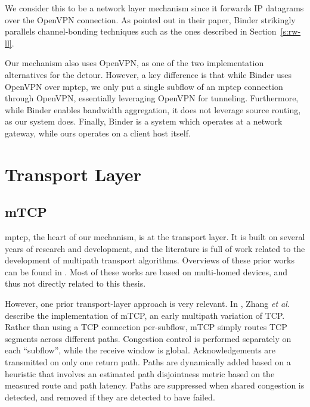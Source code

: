 \documentclass{cwru}
\begin{document}
We consider this to be a network layer mechanism since it forwards IP datagrams
over the OpenVPN connection. As pointed out in their paper, Binder strikingly
parallels channel-bonding techniques such as the ones described in
Section~\ref{s:rw-ll}.

Our mechanism also uses OpenVPN, as one of the two implementation alternatives
for the detour. However, a key difference is that while Binder uses OpenVPN over
\ac{mptcp}, we only put a single subflow of an \ac{mptcp} connection through
OpenVPN, essentially leveraging OpenVPN for tunneling. Furthermore, while Binder
enables bandwidth aggregation, it does not leverage source routing, as our
system does. Finally, Binder is a system which operates at a network gateway,
while ours operates on a client host itself.

\section{Transport Layer}

\subsection{mTCP}
\label{s:rw-transport}

\ac{mptcp}, the heart of our mechanism, is at the transport layer. It is built
on several years of research and development, and the literature is full of work
related to the development of multipath transport algorithms. Overviews of these
prior works can be found in \cite{barre2011multipath,raiciu2012hard}. Most of
these works are based on multi-homed devices, and thus not directly related to
this thesis.

However, one prior transport-layer approach is very relevant. In
\cite{zhang2004transport}, Zhang \textit{et al.} describe the implementation of
mTCP, an early multipath variation of TCP. Rather than using a TCP connection
per-subflow, mTCP simply routes TCP segments across different paths. Congestion
control is performed separately on each ``subflow'', while the receive window is
global. Acknowledgements are transmitted on only one return path. Paths are
dynamically added based on a heuristic that involves an estimated path
disjointness metric based on the measured route and path latency. Paths are
suppressed when shared congestion is detected, and removed if they are detected
to have failed.
\end{document}
